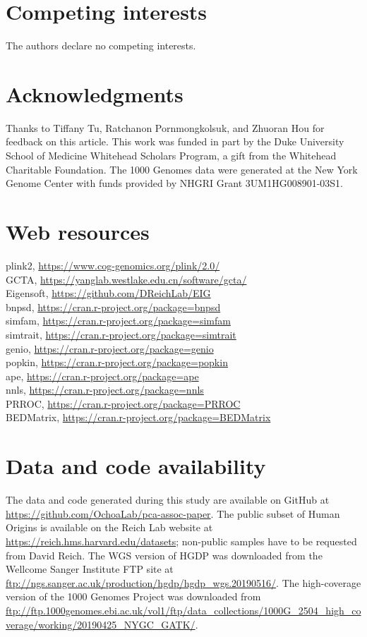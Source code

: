 \documentclass[11pt]{article}
\begin{document}
\begin{linenumbers}
\section*{Competing interests}
The authors declare no competing interests.

\section*{Acknowledgments}
Thanks to Tiffany Tu, Ratchanon Pornmongkolsuk, and Zhuoran Hou for feedback on this article.
This work was funded in part by the Duke University School of Medicine Whitehead Scholars Program, a gift from the Whitehead Charitable Foundation.
The 1000 Genomes data were generated at the New York Genome Center with funds provided by NHGRI Grant 3UM1HG008901-03S1.

\section*{Web resources}
plink2, \url{https://www.cog-genomics.org/plink/2.0/}\\
GCTA, \url{https://yanglab.westlake.edu.cn/software/gcta/}\\
Eigensoft, \url{https://github.com/DReichLab/EIG}\\
bnpsd, \url{https://cran.r-project.org/package=bnpsd}\\
simfam, \url{https://cran.r-project.org/package=simfam}\\
simtrait, \url{https://cran.r-project.org/package=simtrait}\\
genio, \url{https://cran.r-project.org/package=genio}\\
popkin, \url{https://cran.r-project.org/package=popkin}\\
ape, \url{https://cran.r-project.org/package=ape}\\
nnls, \url{https://cran.r-project.org/package=nnls}\\
PRROC, \url{https://cran.r-project.org/package=PRROC}\\
BEDMatrix, \url{https://cran.r-project.org/package=BEDMatrix}

\section*{Data and code availability}
The data and code generated during this study are available on GitHub at \url{https://github.com/OchoaLab/pca-assoc-paper}.
The public subset of Human Origins is available on the Reich Lab website at \url{https://reich.hms.harvard.edu/datasets}; non-public samples have to be requested from David Reich.
The WGS version of HGDP was downloaded from the Wellcome Sanger Institute FTP site at \url{ftp://ngs.sanger.ac.uk/production/hgdp/hgdp_wgs.20190516/}.
The high-coverage version of the 1000 Genomes Project was downloaded from \url{ftp://ftp.1000genomes.ebi.ac.uk/vol1/ftp/data_collections/1000G_2504_high_coverage/working/20190425_NYGC_GATK/}.

\printbibliography

\end{linenumbers}
\end{document}
